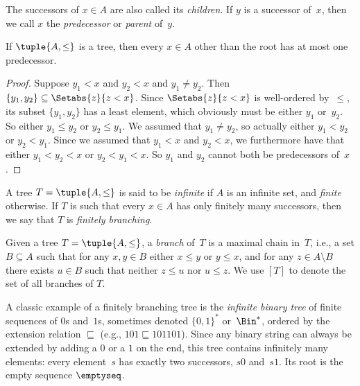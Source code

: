 \documentclass[../../../include/open-logic-section]{subfiles}
\begin{document}
The successors of $x \in A$ are also called its \emph{children}. If
$y$ is a successor of~$x$, then we call $x$ the \emph{predecessor} or
\emph{parent} of~$y$.

\begin{prop}
If $\tuple{A,\le}$ is a tree, then every $x \in A$ other than the root
has at most one predecessor.
\end{prop}

\begin{proof}
  Suppose $y_1 < x$ and $y_2 < x$ and $y_1 \neq y_2$. Then $\{y_1,
  y_2\} \subseteq \Setabs{z}{z<x}$. Since $\Setabs{z}{z<x}$ is
  well-ordered by~$\le$, its subset $\{y_1, y_2\}$ has a least
  element, which obviously must be either $y_1$ or~$y_2$. So either
  $y_1 \le y_2$ or $y_2 \le y_1$. We assumed that $y_1 \neq y_2$, so
  actually either $y_1 < y_2$ or $y_2 < y_1$. Since we assumed that
  $y_1 < x$ and $y_2 < x$, we furthermore have that either $y_1 < y_2
  < x$ or $y_2 < y_1 < x$. So $y_1$ and $y_2$ cannot both be
  predecessors of~$x$.
\end{proof}

\begin{defn}
A tree $T = \tuple{A, \le}$ is said to be \emph{infinite} if $A$ is an
infinite set, and \emph{finite} otherwise. If $T$ is such that every
$x \in A$ has only finitely many successors, then we say that $T$ is
\emph{finitely branching}.
\end{defn}

\begin{defn}[Branches]
Given a tree $T = \tuple{A, \le}$, a \emph{branch} of~$T$ is a
maximal chain in~$T$, i.e., a set $B \subseteq A$ such that
for any $x, y \in B$ either $x \le y$ or $y \le x$, and for any
$z \in A \setminus B$ there exists $u \in B$ such that neither
$z \le u$ nor $u \le z$.
%
We use $[T]$ to denote the set of all branches of $T$.
\end{defn}

\begin{ex}
A classic example of a finitely branching tree is the
\emph{infinite binary tree} of finite sequences of $0$s and~$1$s,
sometimes denoted $\{0,1\}^*$ or~$\Bin^*$, ordered by the extension
relation $\sqsubseteq$ (e.g., $101 \sqsubseteq 101101$).
Since any binary string can always be extended by adding
a $0$ or a $1$ on the end, this tree contains infinitely
many elements: every element~$s$ has exactly two successors, $s0$ and~$s1$. Its root is the empty sequence $\emptyseq$.
\end{ex}
\end{document}
